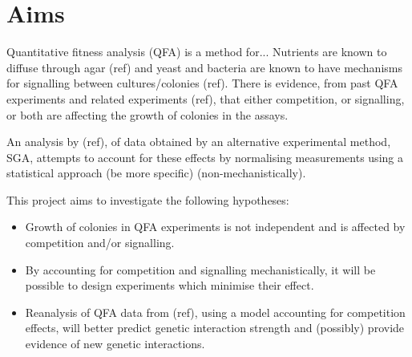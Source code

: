 
\section{Aims}
\label{sec:aims}


Quantitative fitness analysis (QFA) is a method for...  Nutrients are
known to diffuse through agar (ref) and yeast and bacteria are known
to have mechanisms for signalling between cultures/colonies
(ref). There is evidence, from past QFA experiments and related
experiments (ref), that either competition, or signalling, or both are
affecting the growth of colonies in the assays.

An analysis by (ref), of data obtained by an alternative experimental method,
SGA, attempts to account for these effects by normalising measurements
using a statistical approach (be more specific) (non-mechanistically).

This project aims to investigate the following hypotheses:
\begin{itemize}
\item Growth of colonies in QFA experiments is not independent and is
  affected by competition and/or signalling.
\item By accounting for competition and signalling mechanistically, it
  will be possible to design experiments which minimise their effect.
\item Reanalysis of QFA data from (ref), using a model accounting for
  competition effects, will better predict genetic interaction
  strength and (possibly) provide evidence of new genetic interactions.
\end{itemize}



